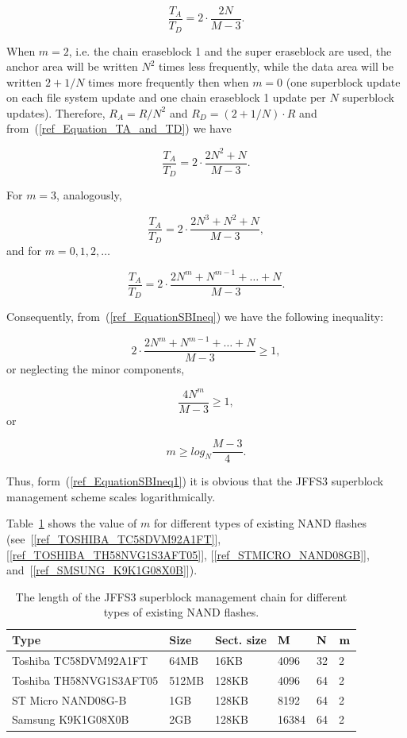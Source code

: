 $$
\frac{T_A}{T_D} = 2 \cdot \frac{2N}{M-3}.
$$

When $m = 2$, i.e. the chain eraseblock 1 and the super eraseblock are used,
the anchor area will be written $N^2$ times less frequently, while the data
area will be written $2+1/N$ times more frequently then when $m = 0$ (one
superblock update on each file system update and one chain eraseblock 1 update
per $N$ superblock updates). Therefore, $R_A=R/N^2$ and $R_D = (2 + 1/N) \cdot
R$ and from~(\ref{ref_Equation_TA_and_TD}) we have

$$
\frac{T_A}{T_D} = 2 \cdot \frac{2N^2+N}{M-3}.
$$

For $m = 3$, analogously,

$$
\frac{T_A}{T_D} = 2 \cdot \frac{2N^3 + N^2 + N}{M-3},
$$
and for $m = 0,1,2,\ldots$

$$
\frac{T_A}{T_D} = 2 \cdot \frac{2N^m + N^{m-1} + \ldots + N}{M-3}.
\label{ref_Equation_TA_div_TD}
$$

Consequently, from~(\ref{ref_EquationSBIneq}) we have the following inequality:

$$
2 \cdot \frac{2N^m + N^{m-1} + \ldots + N}{M-3} \geqslant 1,
$$
or neglecting the minor components,

$$
\frac{4N^m}{M-3} \geqslant 1,
$$
or

\begin{equation}
m \geqslant log_N{\frac{M-3}{4}}.
\label{ref_EquationSBIneq1}
\end{equation}

Thus, form~(\ref{ref_EquationSBIneq1}) it is obvious that the JFFS3 superblock
management scheme scales logarithmically.

Table~\ref{ref_TableNANDLevels} shows the value of $m$ for different types of
existing NAND flashes (see~[\ref{ref_TOSHIBA_TC58DVM92A1FT}],
[\ref{ref_TOSHIBA_TH58NVG1S3AFT05}], [\ref{ref_STMICRO_NAND08GB}],
and~[\ref{ref_SMSUNG_K9K1G08X0B}]).

\begin{table}[h]
\begin{center}
\begin{tabular}{llllll}
\textbf{Type} & \textbf{Size} & \textbf{Sect. size} & $\bf M$ & $\bf N$ &
\textbf{$\bf m$}\\
\hline
Toshiba TC58DVM92A1FT   & 64MB  & 16KB  & 4096  & 32 & 2\\
Toshiba TH58NVG1S3AFT05 & 512MB & 128KB & 4096  & 64 & 2\\
ST Micro NAND08G-B      & 1GB   & 128KB & 8192  & 64 & 2\\
Samsung K9K1G08X0B      & 2GB   & 128KB & 16384 & 64 & 2\\
\end{tabular}
\caption{The length of the JFFS3 superblock management chain for different
types of existing NAND flashes.}
\label{ref_TableNANDLevels}
\end{center}
\end{table}

